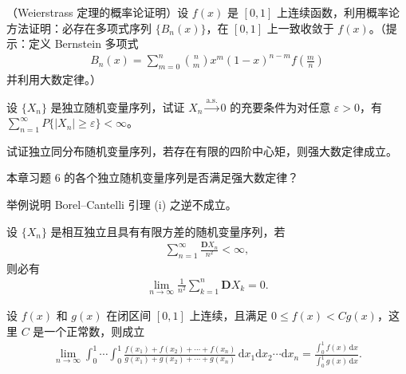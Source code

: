\documentclass[../../main.tex]{subfiles}
\begin{document}
\begin{exercise}\label{exercise:ch05-44}
（Weierstrass 定理的概率论证明）设 $f(x)$ 是 $[0,1]$ 上连续函数，利用概率论方法证明：必存在多项式序列 $\{B_n(x)\}$，在 $[0,1]$ 上一致收敛于 $f(x)$。（提示：定义 Bernstein 多项式
\begin{align*}
B_n(x)=\sum_{m=0}^{n}\binom{n}{m}x^{m}(1-x)^{n-m}f\!\left(\frac{m}{n}\right)
\end{align*}
并利用大数定律。）
\end{exercise}

\begin{exercise}\label{exercise:ch05-45}
设 $\{X_n\}$ 是独立随机变量序列，试证 $X_n\xrightarrow{\mathrm{a.s.}}0$ 的充要条件为对任意 $\varepsilon>0$，有 $\sum_{n=1}^{\infty}P\{|X_n|\geqslant\varepsilon\}<\infty$。
\end{exercise}

\begin{exercise}\label{exercise:ch05-46}
试证独立同分布随机变量序列，若存在有限的四阶中心矩，则强大数定律成立。
\end{exercise}

\begin{exercise}\label{exercise:ch05-47}
本章习题 6 的各个独立随机变量序列是否满足强大数定律？
\end{exercise}

\begin{exercise}\label{exercise:ch05-48}
举例说明 Borel--Cantelli 引理 (i) 之逆不成立。
\end{exercise}

\begin{exercise}\label{exercise:ch05-49}
设 $\{X_n\}$ 是相互独立且具有有限方差的随机变量序列，若
\begin{align*}
\sum_{n=1}^{\infty}\frac{\boldsymbol{D}X_n}{n^{2}}<\infty,
\end{align*}
则必有
\begin{align*}
\lim_{n\to\infty}\frac{1}{n^{2}}\sum_{k=1}^{n}\boldsymbol{D}X_k=0.
\end{align*}
\end{exercise}

\begin{exercise}\label{exercise:ch05-50}
设 $f(x)$ 和 $g(x)$ 在闭区间 $[0,1]$ 上连续，且满足 $0\leqslant f(x)<Cg(x)$，这里 $C$ 是一个正常数，则成立
\begin{align*}
\lim_{n\to\infty}\int_{0}^{1}\cdots\int_{0}^{1}\frac{f(x_1)+f(x_2)+\cdots+f(x_n)}{g(x_1)+g(x_2)+\cdots+g(x_n)}\,\mathrm{d}x_1\mathrm{d}x_2\cdots\mathrm{d}x_n
=\frac{\int_{0}^{1}f(x)\,\mathrm{d}x}{\int_{0}^{1}g(x)\,\mathrm{d}x}.
\end{align*}
\end{exercise}
\end{document}
